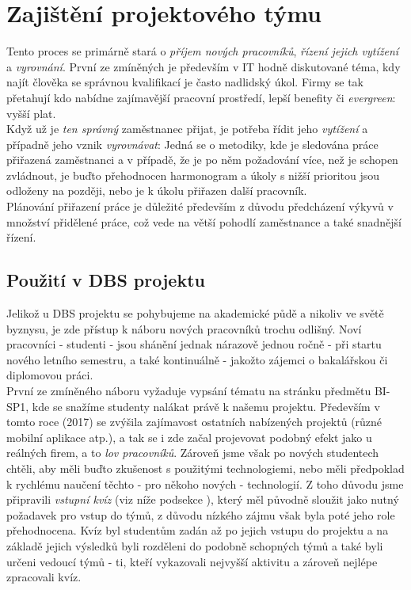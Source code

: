 
\section{Zajištění projektového týmu}

Tento proces se primárně stará o \emph{příjem nových pracovníků}, \emph{řízení jejich vytížení} a \emph{vyrovnání}. První ze zmíněných je především v IT hodně diskutované téma, kdy najít člověka se správnou kvalifikací je často nadlidský úkol. Firmy se tak přetahují kdo nabídne zajímavější pracovní prostředí, lepší benefity či \emph{evergreen}: vyšší plat.\\
Když už je \emph{ten správný} zaměstnanec přijat, je potřeba řídit jeho \emph{vytížení} a případně jeho vznik \emph{vyrovnávat}: Jedná se o metodiky, kde je sledována práce přiřazená zaměstnanci a v případě, že je po něm požadování více, než je schopen zvládnout, je buďto přehodnocen harmonogram a úkoly s nižší prioritou jsou odloženy na později, nebo je k úkolu přiřazen další pracovník.\\
Plánování přiřazení práce je důležité především z důvodu předcházení výkyvů v množství přidělené práce, což vede na větší pohodlí zaměstnance a také snadnější řízení. 

\subsection{Použití v DBS projektu}
Jelikož u DBS projektu se pohybujeme na akademické půdě a nikoliv ve světě byznysu, je zde přístup k náboru nových pracovníků trochu odlišný. Noví pracovníci - studenti - jsou shánění jednak nárazově jednou ročně - při startu nového letního semestru, a také kontinuálně - jakožto zájemci o bakalářskou či diplomovou práci.\\
První ze zmíněného náboru vyžaduje vypsání tématu na stránku předmětu BI-SP1, kde se snažíme studenty nalákat právě k našemu projektu. Především v tomto roce (2017) se zvýšila zajímavost ostatních nabízených projektů (různé mobilní aplikace atp.), a tak se i zde začal projevovat podobný efekt jako u reálných firem, a to \emph{lov pracovníků}. Zároveň jsme však po nových studentech chtěli, aby měli buďto zkušenost s použitými technologiemi, nebo měli předpoklad k rychlému naučení těchto - pro někoho nových - technologií. Z toho důvodu jsme připravili \emph{vstupní kvíz} (viz níže podsekce ), který měl původně sloužit jako nutný požadavek pro vstup do týmů, z důvodu nízkého zájmu však byla poté jeho role přehodnocena. Kvíz byl studentům zadán až po jejich vstupu do projektu a na základě jejich výsledků byli rozděleni do podobně schopných týmů a také byli určeni vedoucí týmů - ti, kteří vykazovali nejvyšší aktivitu a zároveň nejlépe zpracovali kvíz.

